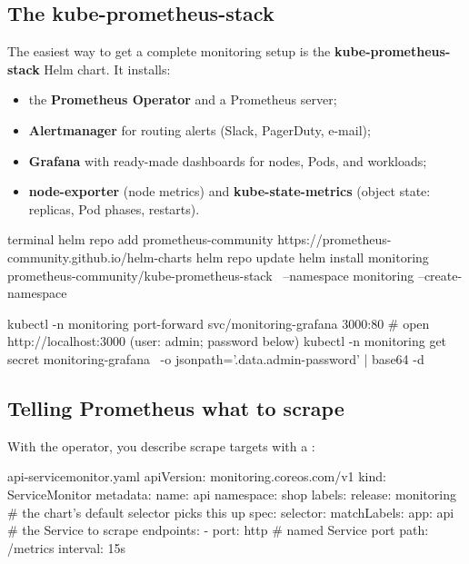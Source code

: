 \subsection{The kube-prometheus-stack}

The easiest way to get a complete monitoring setup is the
\textbf{kube-prometheus-stack} Helm chart. It installs:

\begin{itemize}
  \item the \textbf{Prometheus Operator} and a Prometheus server;
  \item \textbf{Alertmanager} for routing alerts (Slack, PagerDuty, e-mail);
  \item \textbf{Grafana} with ready-made dashboards for nodes, Pods, and workloads;
  \item \textbf{node-exporter} (node metrics) and \textbf{kube-state-metrics}
        (object state: replicas, Pod phases, restarts).
\end{itemize}

\begin{bashcode}{terminal}
helm repo add prometheus-community https://prometheus-community.github.io/helm-charts
helm repo update
helm install monitoring prometheus-community/kube-prometheus-stack \
  --namespace monitoring --create-namespace

kubectl -n monitoring port-forward svc/monitoring-grafana 3000:80
# open http://localhost:3000  (user: admin; password below)
kubectl -n monitoring get secret monitoring-grafana \
  -o jsonpath='{.data.admin-password}' | base64 -d
\end{bashcode}

\subsection{Telling Prometheus what to scrape}

With the operator, you describe scrape targets with a :

\begin{yamlcode}{api-servicemonitor.yaml}
apiVersion: monitoring.coreos.com/v1
kind: ServiceMonitor
metadata:
  name: api
  namespace: shop
  labels:
    release: monitoring        # the chart's default selector picks this up
spec:
  selector:
    matchLabels:
      app: api                 # the Service to scrape
  endpoints:
    - port: http               # named Service port
      path: /metrics
      interval: 15s
\end{yamlcode}


